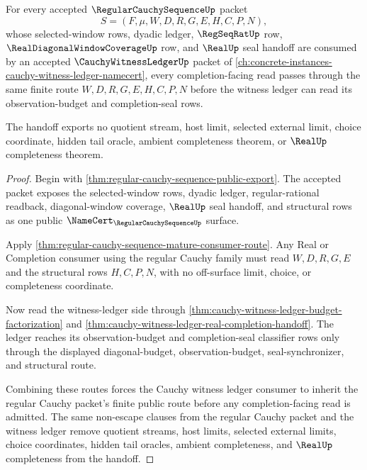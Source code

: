 \begin{theorem}
\label{thm:regular-cauchy-sequence-cauchy-witness-ledger-handoff}
For every accepted $\RegularCauchySequenceUp$ packet
$$
S=(F,\mu,W,D,R,G,E,H,C,P,N),
$$
whose selected-window rows, dyadic ledger, $\RegSeqRatUp$ row, $\RealDiagonalWindowCoverageUp$ row, and $\RealUp$ seal handoff are consumed by an accepted $\CauchyWitnessLedgerUp$ packet of \autoref{ch:concrete-instances-cauchy-witness-ledger-namecert}, every completion-facing read passes through the same finite route $W,D,R,G,E,H,C,P,N$ before the witness ledger can read its observation-budget and completion-seal rows.

The handoff exports no quotient stream, host limit, selected external limit, choice coordinate, hidden tail oracle, ambient completeness theorem, or $\RealUp$ completeness theorem.
\end{theorem}
\begin{proof}
Begin with \autoref{thm:regular-cauchy-sequence-public-export}. The accepted packet exposes the selected-window rows, dyadic ledger, regular-rational readback, diagonal-window coverage, $\RealUp$ seal handoff, and structural rows as one public $\NameCert_{\RegularCauchySequenceUp}$ surface.

Apply \autoref{thm:regular-cauchy-sequence-mature-consumer-route}. Any Real or Completion consumer using the regular Cauchy family must read $W,D,R,G,E$ and the structural rows $H,C,P,N$, with no off-surface limit, choice, or completeness coordinate.

Now read the witness-ledger side through \autoref{thm:cauchy-witness-ledger-budget-factorization} and \autoref{thm:cauchy-witness-ledger-real-completion-handoff}. The ledger reaches its observation-budget and completion-seal classifier rows only through the displayed diagonal-budget, observation-budget, seal-synchronizer, and structural route.

Combining these routes forces the Cauchy witness ledger consumer to inherit the regular Cauchy packet's finite public route before any completion-facing read is admitted. The same non-escape clauses from the regular Cauchy packet and the witness ledger remove quotient streams, host limits, selected external limits, choice coordinates, hidden tail oracles, ambient completeness, and $\RealUp$ completeness from the handoff.
\end{proof}

